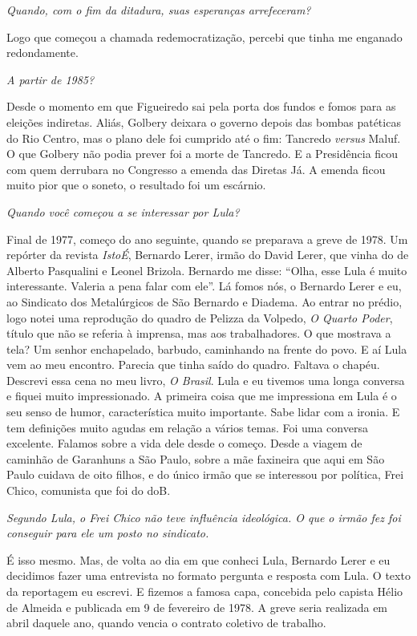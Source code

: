 \itshape
 Quando, com o fim da ditadura, suas esperanças
arrefeceram?

\normalfont
Logo que começou a chamada redemocratização, percebi que
tinha me enganado redondamente.

\itshape
 A partir de 1985?

\normalfont
Desde o momento em que Figueiredo sai pela porta dos
fundos e fomos para as eleições indiretas. Aliás, Golbery deixara o
governo depois das bombas patéticas do Rio Centro, mas o plano dele foi
cumprido até o fim: Tancredo \emph{versus} Maluf. O que Golbery não
podia prever foi a morte de Tancredo. E a Presidência ficou com quem
derrubara no Congresso a emenda das Diretas Já. A emenda ficou muito
pior que o soneto, o resultado foi um escárnio.

\itshape
 Quando você começou a se interessar por Lula?

\normalfont
Final de 1977, começo do ano seguinte, quando se
preparava a greve de 1978. Um repórter da revista \emph{IstoÉ}, Bernardo
Lerer, irmão do David Lerer, que vinha do  de Alberto Pasqualini e
Leonel Brizola. Bernardo me disse: ``Olha, esse Lula é muito
interessante. Valeria a pena falar com ele''. Lá fomos nós, o Bernardo
Lerer e eu, ao Sindicato dos Metalúrgicos de São Bernardo e Diadema. Ao
entrar no prédio, logo notei uma reprodução do quadro de Pelizza da
Volpedo, \emph{O Quarto Poder}, título que não se referia à imprensa,
mas aos trabalhadores. O que mostrava a tela? Um senhor enchapelado,
barbudo, caminhando na frente do povo. E aí Lula vem ao meu encontro.
Parecia que tinha saído do quadro. Faltava o chapéu. Descrevi essa cena
no meu livro, \emph{O Brasil}. Lula e eu tivemos uma longa conversa e
fiquei muito impressionado. A primeira coisa que me impressiona em Lula
é o seu senso de humor, característica muito importante. Sabe lidar com
a ironia. E tem definições muito agudas em relação a vários temas. Foi
uma conversa excelente. Falamos sobre a vida dele desde o começo. Desde
a viagem de caminhão de Garanhuns a São Paulo, sobre a mãe faxineira que
aqui em São Paulo cuidava de oito filhos, e do único irmão que se
interessou por política, Frei Chico, comunista que foi do doB.

\itshape
 Segundo Lula, o Frei Chico não teve influência
ideológica. O que o irmão fez foi conseguir para ele um posto no
sindicato.

\normalfont
É isso mesmo. Mas, de volta ao dia em que conheci Lula,
Bernardo Lerer e eu decidimos fazer uma entrevista no formato pergunta e
resposta com Lula. O texto da reportagem eu escrevi. E fizemos a famosa
capa, concebida pelo capista Hélio de Almeida e publicada em 9 de
fevereiro de 1978. A greve seria realizada em abril daquele ano, quando
vencia o contrato coletivo de trabalho.

